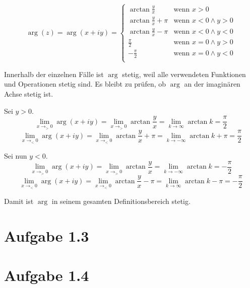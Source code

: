 \documentclass[10pt,a4paper]{article}
\begin{document}
\begin{equation}
  \arg(z) = \arg(x + iy) = \begin{cases}
    \arctan \frac{y}{x} & \text{wenn $x > 0$}\\
    \arctan \frac{y}{x} + \pi & \text{wenn $x < 0 \land y > 0$}\\
    \arctan \frac{y}{x} - \pi & \text{wenn $x < 0 \land y < 0$}\\
    \frac{\pi}{2} & \text{wenn $x = 0 \land y > 0$}\\
    -\frac{\pi}{2} & \text{wenn $x = 0 \land y < 0$}\\
  \end{cases}
\end{equation}

Innerhalb der einzelnen Fälle ist $\arg$ stetig, weil alle verwendeten
Funktionen und Operationen stetig sind. Es bleibt zu prüfen, ob $\arg$ an der
imaginären Achse stetig ist.

\noindent
Sei $y > 0$.
\begin{equation}
  \lim_{x \to_{>} 0} \arg(x + iy) = \lim_{x \to_{>} 0} \arctan \frac{y}{x} = \lim_{k \to \infty} \arctan k = \frac{\pi}{2}
\end{equation}
\begin{equation}
  \lim_{x \to_{<} 0} \arg(x + iy) = \lim_{x \to_{<} 0} \arctan \frac{y}{x} + \pi = \lim_{k \to -\infty} \arctan k + \pi = \frac{\pi}{2}
\end{equation}

\noindent
Sei nun $y < 0$.
\begin{equation}
  \lim_{x \to_{>} 0} \arg(x + iy) = \lim_{x \to_{>} 0} \arctan \frac{y}{x} = \lim_{k \to -\infty} \arctan k = -\frac{\pi}{2}
\end{equation}
\begin{equation}
  \lim_{x \to_{<} 0} \arg(x + iy) = \lim_{x \to_{<} 0} \arctan \frac{y}{x} - \pi = \lim_{k \to \infty} \arctan k - \pi = -\frac{\pi}{2}
\end{equation}

Damit ist $\arg$ in seinem gesamten Definitionsbereich stetig.

\section{Aufgabe 1.3}

\section{Aufgabe 1.4}
\end{document}
